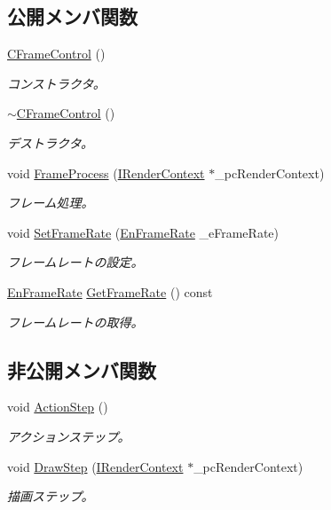 \subsection*{公開メンバ関数}
\begin{DoxyCompactItemize}
\item 
\hyperlink{class_c_frame_control_ab7a3aca2dd8f16f397a868c2fd80e83a}{C\+Frame\+Control} ()
\begin{DoxyCompactList}\small\item\em コンストラクタ。 \end{DoxyCompactList}\item 
\hyperlink{class_c_frame_control_aa347263704fe2a02f33be39bf49196b9}{$\sim$\+C\+Frame\+Control} ()
\begin{DoxyCompactList}\small\item\em デストラクタ。 \end{DoxyCompactList}\item 
void \hyperlink{class_c_frame_control_a9c608dff09f66ff05ac946086046cedb}{Frame\+Process} (\hyperlink{class_i_render_context}{I\+Render\+Context} $\ast$\+\_\+pc\+Render\+Context)
\begin{DoxyCompactList}\small\item\em フレーム処理。 \end{DoxyCompactList}\item 
void \hyperlink{class_c_frame_control_a96a4916210e6373da4c66a46335d14b6}{Set\+Frame\+Rate} (\hyperlink{class_c_frame_control_a4d5daea7d8ab2b21db46d58602fb92c5}{En\+Frame\+Rate} \+\_\+e\+Frame\+Rate)
\begin{DoxyCompactList}\small\item\em フレームレートの設定。 \end{DoxyCompactList}\item 
\hyperlink{class_c_frame_control_a4d5daea7d8ab2b21db46d58602fb92c5}{En\+Frame\+Rate} \hyperlink{class_c_frame_control_a5761d1234db99fc0a248c53fb69f1887}{Get\+Frame\+Rate} () const 
\begin{DoxyCompactList}\small\item\em フレームレートの取得。 \end{DoxyCompactList}\end{DoxyCompactItemize}
\subsection*{非公開メンバ関数}
\begin{DoxyCompactItemize}
\item 
void \hyperlink{class_c_frame_control_ac06dddaff9b6dc0fdbd315ab18abb149}{Action\+Step} ()
\begin{DoxyCompactList}\small\item\em アクションステップ。 \end{DoxyCompactList}\item 
void \hyperlink{class_c_frame_control_a01363f79b83bcc4e696380b7c717ef7e}{Draw\+Step} (\hyperlink{class_i_render_context}{I\+Render\+Context} $\ast$\+\_\+pc\+Render\+Context)
\begin{DoxyCompactList}\small\item\em 描画ステップ。 \end{DoxyCompactList}\end{DoxyCompactItemize}
